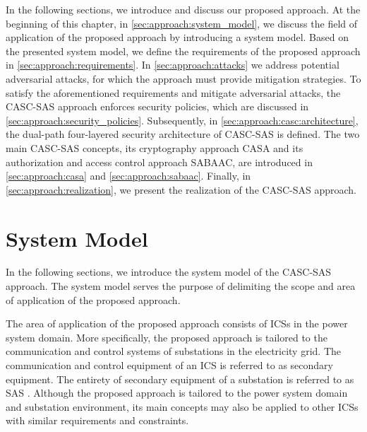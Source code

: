 In the following sections, we introduce and discuss our proposed approach.
At the beginning of this chapter, in \autoref{sec:approach:system_model}, we discuss the field of application of the proposed approach by introducing a system model.
Based on the presented system model, we define the requirements of the proposed approach in \autoref{sec:approach:requirements}.
In \autoref{sec:approach:attacks} we address potential adversarial attacks, for which the approach must provide mitigation strategies.
To satisfy the aforementioned requirements and mitigate adversarial attacks, the CASC-SAS approach enforces security policies, which are discussed in \autoref{sec:approach:security_policies}.
Subsequently, in \autoref{sec:approach:casc:architecture}, the dual-path four-layered security architecture of CASC-SAS is defined.
The two main CASC-SAS concepts, its cryptography approach CASA and its authorization and access control approach SABAAC, are introduced in \autoref{sec:approach:casa} and \autoref{sec:approach:sabaac}.
Finally, in \autoref{sec:approach:realization}, we present the realization of the CASC-SAS approach.

\section{System Model}
\label{sec:approach:system_model}
In the following sections, we introduce the system model of the CASC-SAS approach.
The system model serves the purpose of delimiting the scope and area of application of the proposed approach.

The area of application of the proposed approach consists of ICSs in the power system domain.
More specifically, the proposed approach is tailored to the communication and control systems of substations in the electricity grid.
The communication and control equipment of an ICS is referred to as secondary equipment.
The entirety of secondary equipment of a substation is referred to as SAS \cite{Padilla2015}.
Although the proposed approach is tailored to the power system domain and substation environment, its main concepts may also be applied to other ICSs with similar requirements and constraints.

